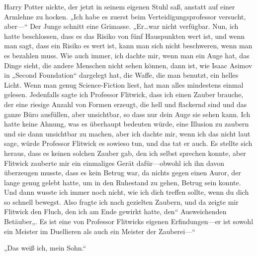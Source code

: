 Harry Potter nickte, der jetzt in seinem eigenen Stuhl saß, anstatt auf einer Armlehne zu hocken. „Ich habe es zuerst beim Verteidigungsprofessor versucht, aber—“ Der Junge schnitt eine Grimasse. „Er…war nicht verfügbar. Nun, ich hatte beschlossen, dass es das Risiko von fünf Hauspunkten wert ist, und wenn man sagt, dass ein Risiko es wert ist, kann man sich nicht beschweren, wenn man es bezahlen muss. Wie auch immer, ich dachte mir, wenn man ein Auge hat, das Dinge sieht, die andere Menschen nicht sehen können, dann ist, wie Isaac Asimov in „Second Foundation“ dargelegt hat, die Waffe, die man benutzt, ein helles Licht. Wenn man genug Science-Fiction liest, hat man alles mindestens einmal gelesen. Jedenfalls sagte ich Professor Flitwick, dass ich einen Zauber brauche, der eine riesige Anzahl von Formen erzeugt, die hell und flackernd sind und das ganze Büro ausfüllen, aber unsichtbar, so dass nur dein Auge sie sehen kann. Ich hatte keine Ahnung, was es überhaupt bedeuten würde, eine Illusion zu zaubern und sie dann unsichtbar zu machen, aber ich dachte mir, wenn ich das nicht laut sage, würde Professor Flitwick es sowieso tun, und das tat er auch. Es stellte sich heraus, dass es keinen solchen Zauber gab, den ich selbst sprechen konnte, aber Flitwick zauberte mir ein einmaliges Gerät dafür—obwohl ich ihn davon überzeugen musste, dass es kein Betrug war, da nichts gegen einen Auror, der lange genug gelebt hatte, um in den Ruhestand zu gehen, Betrug sein konnte. Und dann wusste ich immer noch nicht, wie ich dich treffen sollte, wenn du dich so schnell bewegst. Also fragte ich nach gezielten Zaubern, und da zeigte mir Flitwick den Fluch, den ich am Ende gewirkt hatte, den“ Ausweichenden Betäuber„. Es ist eine von Professor Flitwicks eigenen Erfindungen—er ist sowohl ein Meister im Duellieren als auch ein Meister der Zauberei—“

„Das weiß ich, mein Sohn.“

